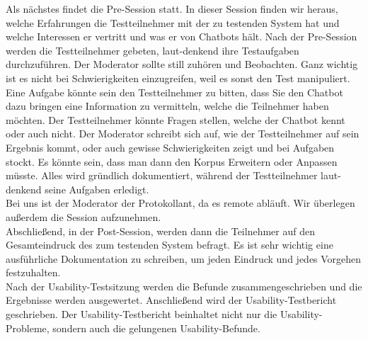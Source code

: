 \noindent Als nächstes findet die Pre-Session statt. In dieser Session finden wir heraus, welche Erfahrungen die Testteilnehmer mit der zu testenden System hat und welche Interessen er vertritt und was er von Chatbots hält. 
Nach der Pre-Session werden die Testteilnehmer gebeten, laut-denkend ihre Testaufgaben durchzuführen. 
Der Moderator sollte still zuhören und Beobachten. Ganz wichtig ist es nicht bei Schwierigkeiten einzugreifen, weil es sonst den Test manipuliert.
\\

\noindent Eine Aufgabe könnte sein den Testteilnehmer zu bitten, dass Sie den Chatbot dazu bringen eine Information zu vermitteln, welche die Teilnehmer haben möchten. 
Der Testteilnehmer könnte Fragen stellen, welche der Chatbot kennt oder auch nicht. 
Der Moderator schreibt sich auf, wie der Testteilnehmer auf sein Ergebnis kommt, oder auch gewisse Schwierigkeiten zeigt und bei Aufgaben stockt. 
Es könnte sein, dass man dann den Korpus Erweitern oder Anpassen müsste. 
Alles wird gründlich dokumentiert, während der Testteilnehmer laut-denkend seine Aufgaben erledigt.
\\

\noindent Bei uns ist der Moderator der Protokollant, da es remote abläuft. Wir überlegen außerdem die Session aufzunehmen. 
\\

\noindent Abschließend, in der Post-Session, werden dann die Teilnehmer auf den Gesamteindruck des zum testenden System befragt. 
Es ist sehr wichtig eine ausführliche Dokumentation zu schreiben, um jeden Eindruck und jedes Vorgehen festzuhalten.
\\

\noindent Nach der Usability-Testsitzung werden die Befunde zusammengeschrieben und die Ergebnisse werden ausgewertet. 
Anschließend wird der Usability-Testbericht geschrieben. 
Der Usability-Testbericht beinhaltet nicht nur die Usability-Probleme, sondern auch die gelungenen Usability-Befunde.
